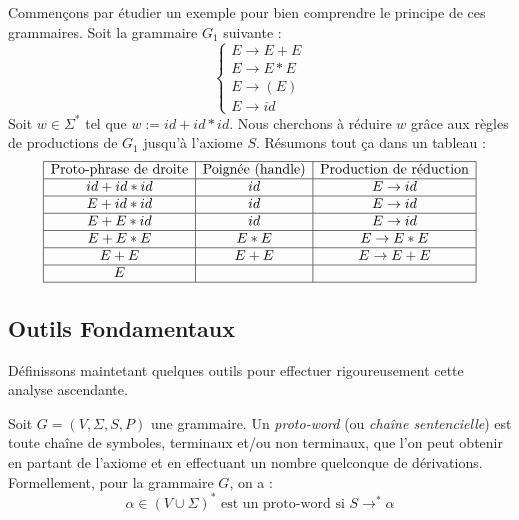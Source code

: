 \begin{example}
    Commençons par étudier un exemple pour bien comprendre le principe de ces grammaires. 
    Soit la grammaire $G_1$ suivante : 
        \[ 
            \begin{cases}
                E \to E + E \\ 
                E \to E * E \\ 
                E \to (E) \\ 
                E \to id 
            \end{cases}
        \] 
    Soit $ w \in \Sigma^*$ tel que $w := id + id * id$. Nous cherchons à réduire $w$ grâce aux règles de 
    productions de $G_1$ jusqu'à l'axiome $S$. Résumons tout ça dans un tableau : 
        \[ 
            \begin{array}{|c|c|c|}
                \hline 
                \text{Proto-phrase de droite} & \text{Poignée (handle)} & \text{Production de réduction} \\ 
                \hline 
                id + id * id & id & E \to id \\
                \hline  
                E + id * id & id & E \to id \\ 
                \hline
                E + E * id & id & E \to id \\ 
                \hline 
                E + E * E & E * E & E \to E * E \\ 
                \hline
                E + E & E + E & E \to E + E \\ 
                \hline 
                E & & \\
                \hline 
            \end{array}
        \] 
\end{example}

\subsection{Outils Fondamentaux}

Définissons maintetant quelques outils pour effectuer rigoureusement cette analyse ascendante. 

\begin{definition}
    Soit $G = (V, \Sigma, S, P)$ une grammaire. Un \emph{proto-word} (ou \emph{chaîne sentencielle}) est 
    toute chaîne de symboles, terminaux et/ou non terminaux, que l'on peut obtenir en partant de 
    l'axiome et en effectuant un nombre quelconque de dérivations. 
    Formellement, pour la grammaire $G$, on a : 
        \[ \alpha \in (V \cup \Sigma)^* \text{ est un proto-word si } S \to^* \alpha \] 
\end{definition}

